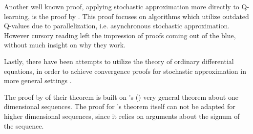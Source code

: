 Another well known proof, applying stochastic approximation more directly to Q-learning, is the proof by \textcite{tsitsiklisAsynchronousStochasticApproximation1994}. This proof focuses on algorithms which utilize outdated Q-values due to parallelization, i.e. asynchronous stochastic approximation. However cursory reading left the impression of proofs coming out of the blue, without much insight on why they work.  

Lastly, there have been attempts to utilize the theory of ordinary differential equations, in order to achieve convergence proofs for stochastic approximation in more general settings \parencite{kushnerStochasticApproximationAlgorithms1997,borkarMethodConvergenceStochastic2000}.

The proof by \citeauthor{jaakkolaConvergenceStochasticIterative1994a} of their theorem is built on \citeauthor{dvoretzkyStochasticApproximation1956}'s (\citeyear{dvoretzkyStochasticApproximation1956}) very general theorem about one dimensional sequences. The proof for \citeauthor{dvoretzkyStochasticApproximation1956}'s theorem itself can not be adapted for higher dimensional sequences, since it relies on arguments about the signum of the sequence. 


